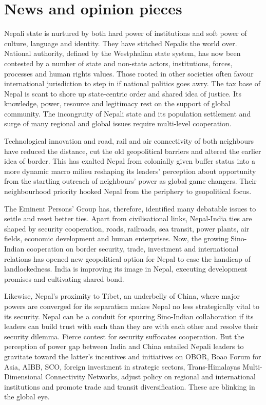 \documentclass[
  openany]{book}
\begin{document}
\hypertarget{news-and-opinion-pieces}{%
\section{News and opinion pieces}\label{news-and-opinion-pieces}}

Nepali state is nurtured by both hard power of institutions and soft power of culture, language and identity. They have stitched Nepalis the world over. National authority, defined by the Westphalian state system, has now been contested by a number of state and non-state actors, institutions, forces, processes and human rights values. Those rooted in other societies often favour international jurisdiction to step in if national politics goes awry. The tax base of Nepal is scant to shore up state-centric order and shared idea of justice. Its knowledge, power, resource and legitimacy rest on the support of global community. The incongruity of Nepali state and its population settlement and surge of many regional and global issues require multi-level cooperation.

Technological innovation and road, rail and air connectivity of both neighbours have reduced the distance, cut the old geopolitical barriers and altered the earlier idea of border. This has exalted Nepal from colonially given buffer status into a more dynamic macro milieu reshaping its leaders' perception about opportunity from the startling outreach of neighbours' power as global game changers. Their neighbourhood priority hooked Nepal from the periphery to geopolitical focus.

The Eminent Persons' Group has, therefore, identified many debatable issues to settle and reset better ties. Apart from civilisational links, Nepal-India ties are shaped by security cooperation, roads, railroads, sea transit, power plants, air fields, economic development and human enterprises. Now, the growing Sino-Indian cooperation on border security, trade, investment and international relations has opened new geopolitical option for Nepal to ease the handicap of landlockedness. India is improving its image in Nepal, executing development promises and cultivating shared bond.

Likewise, Nepal's proximity to Tibet, an underbelly of China, where major powers are converged for its separatism makes Nepal no less strategically vital to its security. Nepal can be a conduit for spurring Sino-Indian collaboration if its leaders can build trust with each than they are with each other and resolve their security dilemma. Fierce contest for security suffocates cooperation. But the perception of power gap between India and China entailed Nepali leaders to gravitate toward the latter's incentives and initiatives on OBOR, Boao Forum for Asia, AIBB, SCO, foreign investment in strategic sectors, Trans-Himalayas Multi-Dimensional Connectivity Networks, adjust policy on regional and international institutions and promote trade and transit diversification. These are blinking in the global eye.
\end{document}
